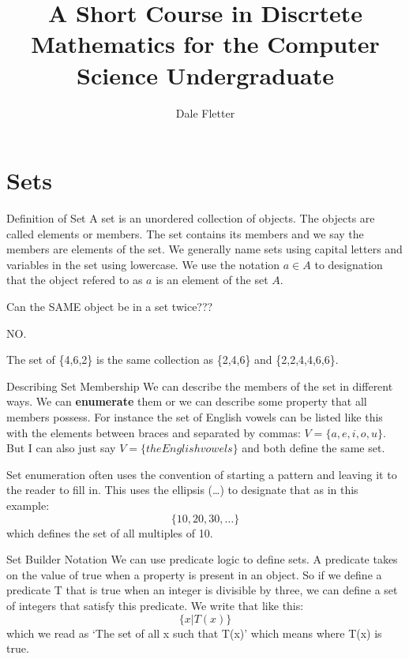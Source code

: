 \documentclass [handout]{beamer}
\title[Discrete Math]{A Short Course in Discrtete Mathematics for the Computer Science Undergraduate}
\author{Dale Fletter}
\institute{UC Davis, ECS20, Summer Session 2}
\date{}
\begin{document}
\begin{frame}
\titlepage
\end{frame}

\section{Sets}
\begin{frame}{Definition of Set}
A set is an unordered collection of objects. The objects are called elements or members. The set contains its members and we say the members are elements of the set. We generally name sets using capital letters and variables in the set using lowercase. We use the notation $a \in A$ to designation that the object refered to as $a$ is an element of the set $A$.
\end{frame}

\begin{frame}
Can the SAME object be in a set twice???

NO.

The set of \{4,6,2\} is the same collection as \{2,4,6\} and \{2,2,4,4,6,6\}.
\end{frame}



\begin{frame}{Describing Set Membership}
We can describe the members of the set in different ways. We can \textbf{enumerate} them or we can describe some property that all members possess. For instance the set of English vowels can be listed like this with the elements between braces and separated by commas: $V = \{a,e,i,o,u\}$. But I can also just say $V= \{the English vowels\}$ and both define the same set. 
\end{frame}

\begin{frame}
Set enumeration often uses the convention of starting a pattern and leaving it to the reader to fill in. This uses the ellipsis (\ldots) to designate that as in this example:
\begin{displaymath}
\{10,20,30, \ldots \}
\end{displaymath}
which defines the set of all multiples of 10.
\end{frame}

\begin{frame}{Set Builder Notation}
We can use predicate logic to define sets. A predicate takes on the value of true when a property is present in an object. So if we define a predicate T that is true when an integer is divisible by three, we can define a set of integers that satisfy this predicate. We write that like this:
\begin{displaymath}
\{x | T(x) \} 
\end{displaymath}
which we read as `The set of all x such that T(x)' which means where T(x) is true. 
\end{frame}
\end{document}
